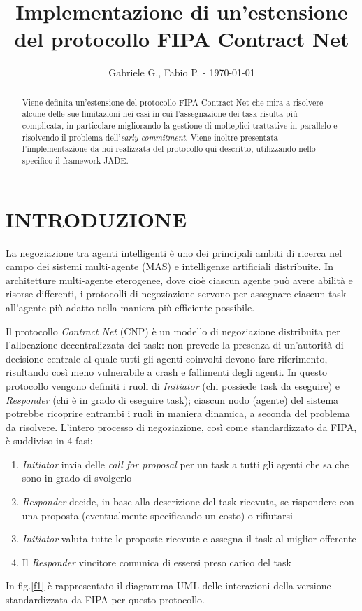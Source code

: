 \documentclass[a4paper, 10pt, conference]{ieeeconf} %
\title{\LARGE \bf Implementazione di un'estensione del protocollo FIPA Contract Net}
\author{Gabriele G., Fabio P. - \today}
\begin{document}
\maketitle
\thispagestyle{empty}
\pagestyle{empty}

\begin{abstract}
Viene definita un'estensione del protocollo FIPA Contract Net\cite{c1} che mira a risolvere alcune delle sue limitazioni nei casi in cui l'assegnazione dei task risulta più complicata, in particolare migliorando la gestione di molteplici trattative in parallelo e risolvendo il problema dell'\emph{early commitment}. Viene inoltre presentata l'implementazione da noi realizzata del protocollo qui descritto, utilizzando nello specifico il framework JADE\cite{c2}.
\end{abstract}

\section{INTRODUZIONE} \label{s0}
La negoziazione tra agenti intelligenti è uno dei principali ambiti di ricerca nel campo dei sistemi multi-agente (MAS) e intelligenze artificiali distribuite. In architetture multi-agente eterogenee, dove cioè ciascun agente può avere abilità e risorse differenti, i protocolli di negoziazione servono per assegnare ciascun task all'agente più adatto nella maniera più efficiente possibile.

Il protocollo \emph{Contract Net}\cite{c3} (CNP) è un modello di negoziazione distribuita per l'allocazione decentralizzata dei task: non prevede la presenza di un'autorità di decisione centrale al quale tutti gli agenti coinvolti devono fare riferimento, risultando così meno vulnerabile a crash e fallimenti degli agenti. In questo protocollo vengono definiti i ruoli di \emph{Initiator} (chi possiede task da eseguire) e \emph{Responder} (chi è in grado di eseguire task); ciascun nodo (agente) del sistema potrebbe ricoprire entrambi i ruoli in maniera dinamica, a seconda del problema da risolvere. L'intero processo di negoziazione, così come standardizzato da FIPA, è suddiviso in 4 fasi:
\begin{enumerate}
\item{\emph{Initiator} invia delle \emph{call for proposal} per un task a tutti gli agenti che sa che sono in grado di svolgerlo}
\item{\emph{Responder} decide, in base alla descrizione del task ricevuta, se rispondere con una proposta (eventualmente specificando un costo) o rifiutarsi}
\item{\emph{Initiator} valuta tutte le proposte ricevute e assegna il task al miglior offerente}
\item{Il \emph{Responder} vincitore comunica di essersi preso carico del task}
\end{enumerate}
In fig.\ref{f1} è rappresentato il diagramma UML delle interazioni della versione standardizzata da FIPA per questo protocollo.
\end{document}
